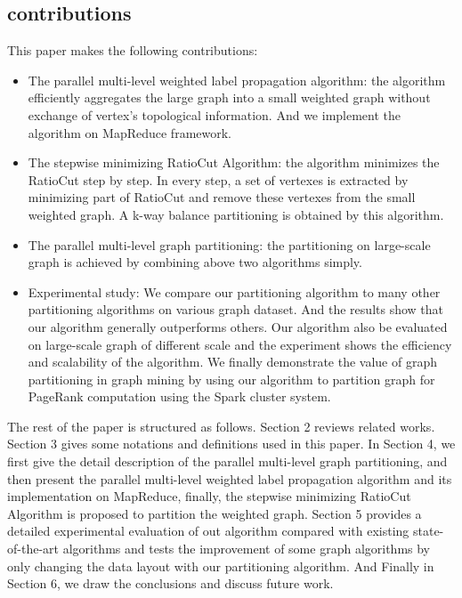 \documentclass{acm_proc_article-sp}
\begin{document}
\subsection{ contributions}
This paper makes the following contributions:
\begin{itemize}
\item The parallel multi-level weighted label propagation algorithm: the algorithm efficiently aggregates the large graph into a small weighted graph without exchange of vertex's topological information. And we implement the algorithm on MapReduce framework.
\item The stepwise minimizing RatioCut Algorithm: the algorithm minimizes the RatioCut step by step. In every step, a set of vertexes is extracted by minimizing part of RatioCut and remove these vertexes from the small weighted graph. A k-way balance partitioning is obtained by this algorithm.
\item The parallel multi-level graph partitioning: the partitioning on large-scale graph is achieved by combining above two algorithms simply.
\item Experimental study: We compare our partitioning algorithm to many other partitioning algorithms on various graph dataset. And the results show that our algorithm generally outperforms others. Our algorithm also be evaluated on large-scale graph of different scale and the experiment shows the efficiency and scalability of the algorithm. We finally demonstrate the value of graph partitioning in graph mining by using our algorithm to partition graph for PageRank computation using the Spark cluster system.
\end{itemize}
\par
The rest of the paper is structured as follows. Section 2 reviews related works. Section 3 gives some notations and definitions used in this paper. In Section 4, we first give the detail description of the parallel multi-level graph partitioning, and then present the parallel multi-level weighted label propagation algorithm and its implementation on MapReduce, finally, the stepwise minimizing RatioCut Algorithm is proposed to partition the weighted graph.  Section 5 provides a detailed experimental evaluation of out algorithm compared with existing state-of-the-art algorithms and tests the improvement of some graph algorithms by only changing the data layout with our partitioning algorithm. And Finally in Section 6, we draw the conclusions and discuss future work.
\end{document}
